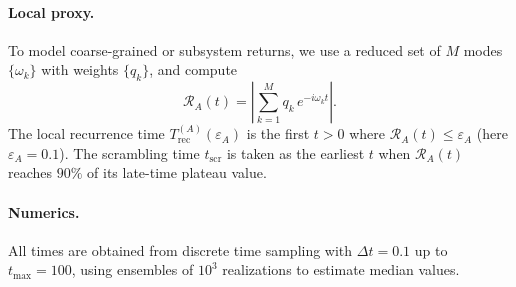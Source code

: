 \documentclass[12pt]{article}
\newcommand{\TrecA}{T^{(A)}_{\mathrm{rec}}}
\newcommand{\tscr}{t_{\mathrm{scr}}}
\theoremstyle{remark}
\begin{document}
\paragraph{Local proxy.}
To model coarse-grained or subsystem returns, we use a reduced set of $M$ modes $\{\omega_k\}$ with weights $\{q_k\}$, and compute
\[
\mathcal{R}_A(t) = \left| \sum_{k=1}^M q_k \, e^{-i \omega_k t} \right| .
\]
The local recurrence time $\TrecA(\varepsilon_A)$ is the first $t>0$ where $\mathcal{R}_A(t) \leq \varepsilon_A$ (here $\varepsilon_A = 0.1$).
The scrambling time $\tscr$ is taken as the earliest $t$ when $\mathcal{R}_A(t)$ reaches $90\%$ of its late-time plateau value.

\paragraph{Numerics.}
All times are obtained from discrete time sampling with $\Delta t = 0.1$ up to $t_{\max} = 100$, using ensembles of $10^3$ realizations to estimate median values.
\end{document}
